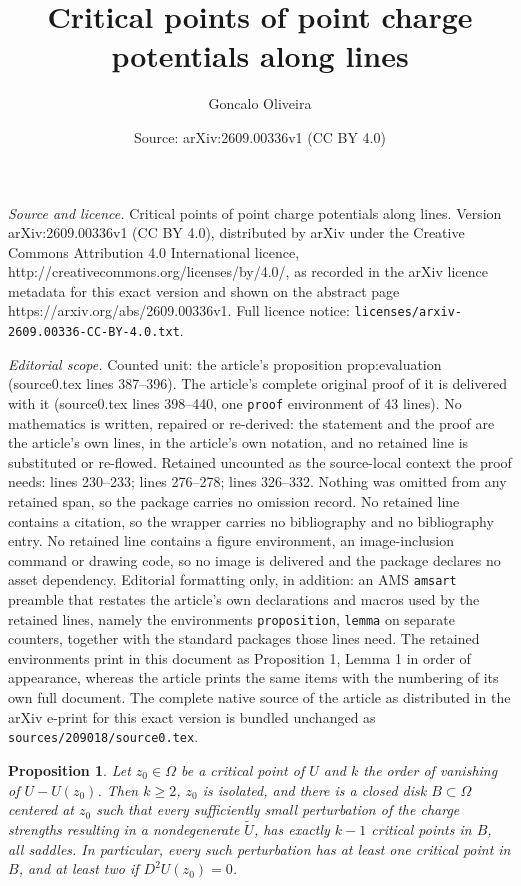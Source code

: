 \documentclass[10pt,a4paper]{amsart}
\title{Critical points of point charge potentials along lines}
\author{Goncalo Oliveira}
\date{Source: arXiv:2609.00336v1 (CC BY 4.0)}
\newtheorem{proposition}{Proposition}
\begin{document}
\maketitle

\noindent\emph{Source and licence.} Critical points of point charge potentials along lines. Version arXiv:2609.00336v1 (CC BY 4.0), distributed by arXiv under the Creative Commons Attribution 4.0 International licence, http://creativecommons.org/licenses/by/4.0/, as recorded in the arXiv licence metadata for this exact version and shown on the abstract page https://arxiv.org/abs/2609.00336v1. Full licence notice: \texttt{licenses/arxiv-2609.00336-CC-BY-4.0.txt}.\par\smallskip

\noindent\textit{Editorial scope.} Counted unit: the article's proposition prop:evaluation (source0.tex lines 387--396). The article's complete original proof of it is delivered with it (source0.tex lines 398--440, one \texttt{proof} environment of 43 lines). No mathematics is written, repaired or re-derived: the statement and the proof are the article's own lines, in the article's own notation, and no retained line is substituted or re-flowed.  Retained uncounted as the source-local context the proof needs: lines 230--233; lines 276--278; lines 326--332.  Nothing was omitted from any retained span, so the package carries no omission record.  No retained line contains a citation, so the wrapper carries no bibliography and no bibliography entry.  No retained line contains a figure environment, an image-inclusion command or drawing code, so no image is delivered and the package declares no asset dependency.  Editorial formatting only, in addition: an AMS \texttt{amsart} preamble that restates the article's own declarations and macros used by the retained lines, namely the environments \texttt{proposition}, \texttt{lemma} on separate counters, together with the standard packages those lines need.  The retained environments print in this document as Proposition 1, Lemma 1 in order of appearance, whereas the article prints the same items with the numbering of its own full document.  The complete native source of the article as distributed in the arXiv e-print for this exact version is bundled unchanged as \texttt{sources/209018/source0.tex}.
	\begin{proposition}\label{prop:local-perturbation}
		Let $z_0\in\Omega$ be a critical point of $U$ and $k$ the order of vanishing of $U-U(z_0)$. %
		Then $k\geq2$, $z_0$ is isolated, and there is a closed disk $B\subset\Omega$ centered at $z_0$ such that every sufficiently small perturbation of the charge strengths resulting in a nondegenerate $\widetilde U$, has exactly $k-1$ critical points in $B$, all saddles. In particular, every such perturbation has at least one critical point in $B$, and at least two if $D^2U(z_0)=0$.
	\end{proposition}
\end{document}
